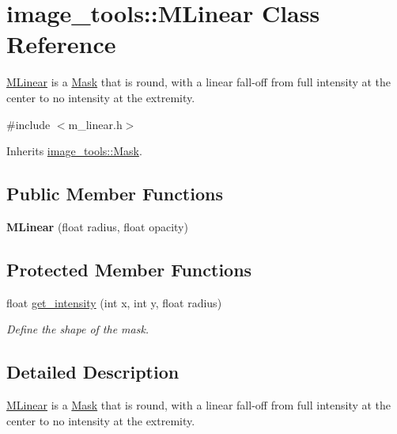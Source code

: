 \hypertarget{classimage__tools_1_1MLinear}{}\section{image\+\_\+tools\+:\+:M\+Linear Class Reference}
\label{classimage__tools_1_1MLinear}


\hyperlink{classimage__tools_1_1MLinear}{M\+Linear} is a \hyperlink{classimage__tools_1_1Mask}{Mask} that is round, with a linear fall-\/off from full intensity at the center to no intensity at the extremity.  




{\ttfamily \#include $<$m\+\_\+linear.\+h$>$}



Inherits \hyperlink{classimage__tools_1_1Mask}{image\+\_\+tools\+::\+Mask}.

\subsection*{Public Member Functions}
\begin{DoxyCompactItemize}
\item 
{\bfseries M\+Linear} (float radius, float opacity)\hypertarget{classimage__tools_1_1MLinear_af84be097b93aaef6785f0ddb8a5af847}{}\label{classimage__tools_1_1MLinear_af84be097b93aaef6785f0ddb8a5af847}

\end{DoxyCompactItemize}
\subsection*{Protected Member Functions}
\begin{DoxyCompactItemize}
\item 
float \hyperlink{classimage__tools_1_1MLinear_aeb72a91e48a0981a1e8f3754a17e174d}{get\+\_\+intensity} (int x, int y, float radius)
\begin{DoxyCompactList}\small\item\em Define the shape of the mask. \end{DoxyCompactList}\end{DoxyCompactItemize}


\subsection{Detailed Description}
\hyperlink{classimage__tools_1_1MLinear}{M\+Linear} is a \hyperlink{classimage__tools_1_1Mask}{Mask} that is round, with a linear fall-\/off from full intensity at the center to no intensity at the extremity. 

